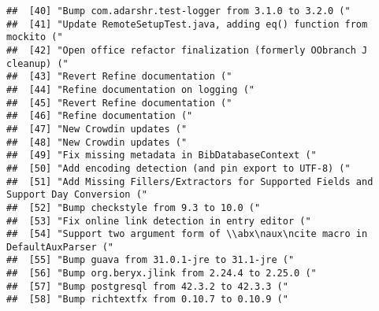 \documentclass[
]{article}
\begin{document}
\begin{verbatim}
##  [40] "Bump com.adarshr.test-logger from 3.1.0 to 3.2.0 ("                                                                         
##  [41] "Update RemoteSetupTest.java, adding eq() function from mockito ("                                                           
##  [42] "Open office refactor finalization (formerly OObranch J cleanup) ("                                                          
##  [43] "Revert Refine documentation ("                                                                                              
##  [44] "Refine documentation on logging ("                                                                                          
##  [45] "Revert Refine documentation ("                                                                                              
##  [46] "Refine documentation ("                                                                                                     
##  [47] "New Crowdin updates ("                                                                                                      
##  [48] "New Crowdin updates ("                                                                                                      
##  [49] "Fix missing metadata in BibDatabaseContext ("                                                                               
##  [50] "Add encoding detection (and pin export to UTF-8) ("                                                                         
##  [51] "Add Missing Fillers/Extractors for Supported Fields and Support Day Conversion ("                                           
##  [52] "Bump checkstyle from 9.3 to 10.0 ("                                                                                         
##  [53] "Fix online link detection in entry editor ("                                                                                
##  [54] "Support two argument form of \\abx\naux\ncite macro in DefaultAuxParser ("                                                  
##  [55] "Bump guava from 31.0.1-jre to 31.1-jre ("                                                                                   
##  [56] "Bump org.beryx.jlink from 2.24.4 to 2.25.0 ("                                                                               
##  [57] "Bump postgresql from 42.3.2 to 42.3.3 ("                                                                                    
##  [58] "Bump richtextfx from 0.10.7 to 0.10.9 ("                                                                                    

\end{verbatim}
\end{document}
